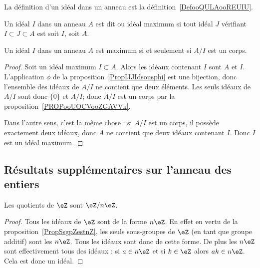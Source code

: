 La définition d'un idéal dans un anneau est la définition~\ref{DefooQULAooREUIU}.

\begin{definition}\label{DEFIdealMax}
Un idéal \( I\) dans un anneau \( A \) est dit  ou idéal maximum si tout idéal \( J \) vérifiant \( I \subset J \subset A \) est soit \( I \), soit \( A \).
\end{definition}

\begin{proposition}     \label{PROPooSHHWooCyZPPw}
    Un idéal \( I\) dans un anneau \( A \) est maximum si et seulement si \( A/I\) est un corps.
\end{proposition}

\begin{proof}
    Soit un idéal maximum \( I\subset A\). Alors les idéaux contenant \( I\) sont \( A\) et \( I\). L'application \( \phi\) de la proposition~\ref{PropIJJIdsousphi} est une bijection, donc l'ensemble des idéaux de \( A/I\) ne contient que deux éléments. Les seuls idéaux de \( A/I\) sont donc \( \{ 0 \}\) et \( A/I\); donc \( A/I\) est un corps par la proposition~\ref{PROPooUOCVooZGAVVk}.

    Dans l'autre sens, c'est la même chose : si \( A/I\) est un corps, il possède exactement deux idéaux, donc \( A\) ne contient que deux idéaux contenant $I$. Donc \( I\) est un idéal maximum.
\end{proof}

\subsection{Résultats supplémentaires sur l'anneau des entiers}

\begin{corollary}       \label{CORooLINXooBlUKPG}
    Les quotients de \( \eZ\) sont \( \eZ/n\eZ\).
\end{corollary}

\begin{proof}
    Tous les idéaux de \( \eZ\) sont de la forme \( n\eZ\). En effet en vertu de la proposition~\ref{PropSsgpZestnZ}, les seuls sous-groupes de \( \eZ\) (en tant que groupe additif) sont les \( n\eZ\). Tous les idéaux sont donc de cette forme. De plus les \( n\eZ\) sont effectivement tous des idéaux : si \( a\in n\eZ\) et si \( k\in \eZ\) alors \( ak\in n\eZ\). Cela est donc un idéal.
\end{proof}


